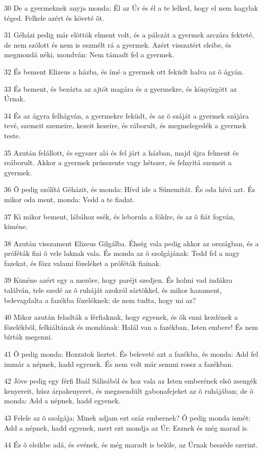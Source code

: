 \par 30 De a gyermeknek anyja monda: Él az Úr és él a te lelked, hogy el nem hagylak téged. Felkele azért és követé õt.
\par 31 Géházi pedig már elõttök elment volt, és a pálczát a gyermek arczára fekteté, de nem szólott és nem is eszmélt rá a gyermek. Azért visszatért eleibe, és megmondá néki, mondván: Nem támadt fel a gyermek.
\par 32 És bement Elizeus a házba, és ímé a gyermek ott feküdt halva az õ ágyán.
\par 33 És bement, és bezárta az ajtót magára és a gyermekre, és könyörgött az Úrnak.
\par 34 És az ágyra felhágván, a gyermekre feküdt, és az õ száját a gyermek szájára tevé, szemeit szemeire, kezeit kezeire, és ráborult, és megmelegedék a gyermek teste.
\par 35 Azután felállott, és egyszer alá és fel járt a házban, majd újra felment és reáborult. Akkor a gyermek prüsszente vagy hétszer, és felnyitá szemeit a gyermek.
\par 36 Õ pedig szólítá Géházit, és monda: Hívd ide a Súnemitát. És oda hívá azt. És mikor oda ment, monda: Vedd a te fiadat.
\par 37 Ki mikor bement, lábához esék, és leborula a földre, és az õ fiát fogván, kiméne.
\par 38 Azután visszament Elizeus Gilgálba. Éhség vala pedig akkor az országban, és a próféták fiai õ vele laknak vala. És monda az õ szolgájának: Tedd fel a nagy fazekat, és fõzz valami fõzeléket a próféták fiainak.
\par 39 Kiméne azért egy a mezõre, hogy paréjt szedjen. És holmi vad indákra találván, tele szedé az õ ruháját azokról sártökkel, és mikor hazament, belevagdalta a fazékba fõzeléknek; de nem tudta, hogy mi az?
\par 40 Mikor azután feladták a férfiaknak, hogy egyenek, és õk enni kezdének a fõzelékbõl, felkiáltának és mondának: Halál van a fazékban, Isten embere! És nem bírták megenni.
\par 41 Õ pedig monda: Hozzatok lisztet. És beleveté azt a fazékba, és monda: Add fel immár a népnek, hadd egyenek. És nem volt már semmi rossz a fazékban.
\par 42 Jöve pedig egy férfi Baál Sálisából és hoz vala az Isten emberének elsõ zsengék kenyereit, húsz árpakenyeret, és megzsendült gabonafejeket az õ ruhájában; de õ monda: Add a népnek, hadd egyenek.
\par 43 Felele az õ szolgája: Minek adjam ezt száz embernek? Õ pedig monda ismét: Add a népnek, hadd egyenek, mert ezt mondja az Úr: Esznek és még marad is.
\par 44 És õ eleikbe adá, és evének, és még maradt is belõle, az Úrnak beszéde szerint.

